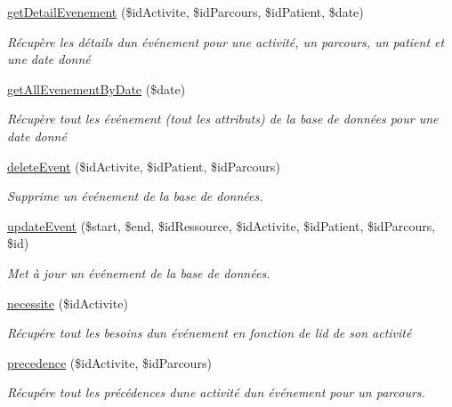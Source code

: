 \begin{DoxyCompactItemize}
\hyperlink{class_m___planning_a9f56bfecc39a1dbc331dfdacb9557541}{get\+Detail\+Evenement} (\$id\+Activite, \$id\+Parcours, \$id\+Patient, \$date)
\begin{DoxyCompactList}\small\item\em Récupère les détails d\textquotesingle{}un événement pour une activité, un parcours, un patient et une date donné \end{DoxyCompactList}\item 
\hyperlink{class_m___planning_ab41d539962a52545111d136aff324ea6}{get\+All\+Evenement\+By\+Date} (\$date)
\begin{DoxyCompactList}\small\item\em Récupère tout les événement (tout les attributs) de la base de données pour une date donné \end{DoxyCompactList}\item 
\hyperlink{class_m___planning_ad34b09b84f2b551e90f10f8a59487ff7}{delete\+Event} (\$id\+Activite, \$id\+Patient, \$id\+Parcours)
\begin{DoxyCompactList}\small\item\em Supprime un événement de la base de données. \end{DoxyCompactList}\item 
\hyperlink{class_m___planning_ae30966fd39181041d0ed71f60b4dd4f7}{update\+Event} (\$start, \$end, \$id\+Ressource, \$id\+Activite, \$id\+Patient, \$id\+Parcours, \$id)
\begin{DoxyCompactList}\small\item\em Met à jour un événement de la base de données. \end{DoxyCompactList}\item 
\hyperlink{class_m___planning_aad09d20b96fb6a40dfa2c347d0cc6d6c}{necessite} (\$id\+Activite)
\begin{DoxyCompactList}\small\item\em Récupére tout les besoins d\textquotesingle{}un événement en fonction de l\textquotesingle{}id de son activité \end{DoxyCompactList}\item 
\hyperlink{class_m___planning_a86a09269af409629a60bf86a2bd19421}{precedence} (\$id\+Activite, \$id\+Parcours)
\begin{DoxyCompactList}\small\item\em Récupére tout les précédences d\textquotesingle{}une activité d\textquotesingle{}un événement pour un parcours. \end{DoxyCompactList}\item 

\end{DoxyCompactItemize}
